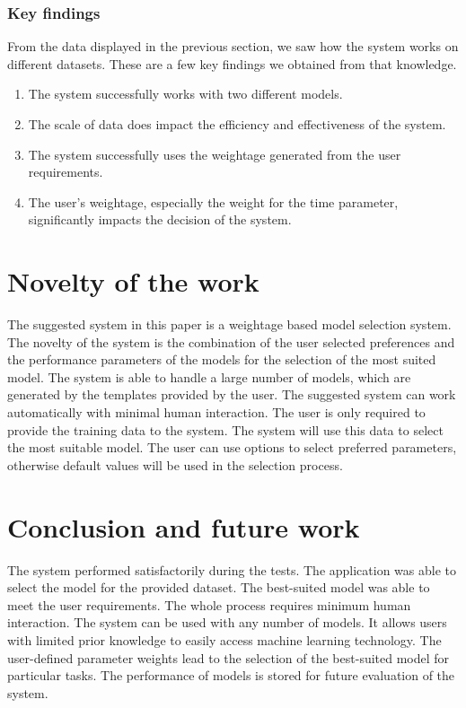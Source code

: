 \documentclass[a4paper,fleqn]{cas-dc}
\begin{document}
\subsubsection{Key findings}\label{subsubsec:key_findings}

From the data displayed in the previous section, we saw how the system works on different datasets. These are a few key findings we obtained from that knowledge.
\begin{enumerate}
    \item The system successfully works with two different models.
    \item The scale of data does impact the efficiency and effectiveness of the system.
    \item The system successfully uses the weightage generated from the user requirements.
    \item The user's weightage, especially the weight for the time parameter, significantly impacts the decision of the system.
\end{enumerate}

\section{Novelty of the work}\label{sec:novelty_of_the_work}

The suggested system in this paper is a weightage based model selection system. The novelty of the system is the combination of the user selected preferences and the performance parameters of the models for the selection of the most suited model. The system is able to handle a large number of models, which are generated by the templates provided by the user. The suggested system can work automatically with minimal human interaction. The user is only required to provide the training data to the system. The system will use this data to select the most suitable model. The user can use options to select preferred parameters, otherwise default values will be used in the selection process.

\section{Conclusion and future work}\label{sec:conclusion_and_futur_work}

The system performed satisfactorily during the tests. The application was able to select the model for the provided dataset. The best-suited model was able to meet the user requirements. The whole process requires minimum human interaction. The system can be used with any number of models. It allows users with limited prior knowledge to easily access machine learning technology. The user-defined parameter weights lead to the selection of the best-suited model for particular tasks. The performance of models is stored for future evaluation of the system.
\end{document}
